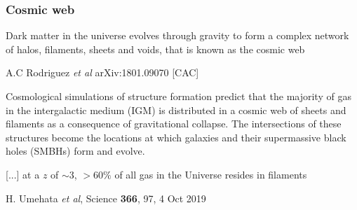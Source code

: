 \begin{frame}
  \frametitle{Cosmic web}

      Dark matter in the universe evolves through gravity to form a complex network
      of halos, filaments, sheets and voids, that is known as the cosmic web

      {\tiny A.C Rodriguez \emph{et al} arXiv:1801.09070 [CAC]}

    Cosmological simulations of structure formation predict that the
    majority of gas in the intergalactic medium (IGM) is distributed
    in a cosmic web of sheets and filaments as a consequence of
    gravitational collapse.  The intersections of these structures
    become the locations at which galaxies and their supermassive
    black holes (SMBHs) form and evolve.

    [...] at a $z$ of $\sim 3$, $>60\%$ of all gas in the
    Universe resides in filaments
    
    {\tiny H. Umehata \emph{et al}, Science  \textbf{366}, 97, 4 Oct 2019}



\end{frame}

